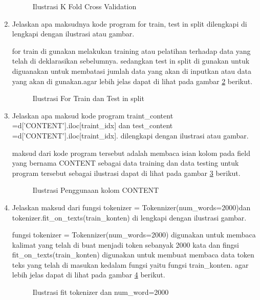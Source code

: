 \begin{enumerate}
\begin{figure}[!htbp]
      \caption{Ilustrasi K Fold Cross Validation}
      \label{c132}
      \end{figure}

\item Jelaskan apa maksudnya kode program for train, test in split dilengkapi di lengkapi dengan ilustrasi atau gambar.\par
for train di gunakan melakukan training atau pelatihan terhadap data yang telah di deklarasikan sebelumnya. sedangkan test in split di gunakan untuk diguanakan untuk membatasi jumlah data yang akan di inputkan atau data yang akan di gunakan.agar lebih jelas dapat di lihat pada gambar \ref{c133} berikut.

\begin{figure}[!htbp]
      \caption{Ilustrasi For Train dan Test in split}
      \label{c133}
      \end{figure}

\item Jelaskan apa maksud kode program traint\_content =d['CONTENT'].iloc[traint\_idx] dan test\_content =d['CONTENT'].iloc[traint\_idx]. dilengkapi dengan ilustrasi atau gambar.\par
maksud dari kode program tersebut adalah membaca isian kolom pada field yang bernama CONTENT sebagai data training dan data testing untuk program tersebut sebagai ilustrasi dapat di lihat pada gambar \ref{c134} berikut.

\begin{figure}[!htbp]
      \caption{Ilustrasi Penggunaan kolom CONTENT}
      \label{c134}
      \end{figure}

\item Jelaskan maksud dari fungsi tokenizer = Tokennizer(num\_words=2000)dan tokenizer.fit\_on\_texts(train\_konten) di lengkapi dengan ilustrasi gambar.\par
fungsi tokenizer = Tokennizer(num\_words=2000) digunakan untuk membaca kalimat yang telah di buat menjadi token sebanyak 2000 kata dan fingsi fit\_on\_texts(train\_konten) digunakan untuk membuat membaca data token teks yang telah di masukan kedalam fungsi yaitu fungsi train\_konten. agar lebih jelas dapat di lihat pada gambar \ref{c135} berikut.

\begin{figure}[!htbp]
      \caption{Ilustrasi fit tokenizer dan num\_word=2000}
      \label{c135}
      \end{figure}


\end{enumerate}
